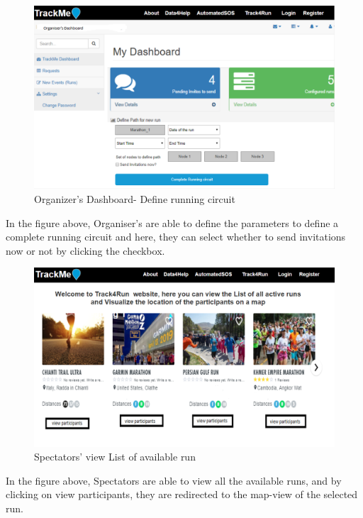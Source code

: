 \documentclass[hidelinks, 12pt]{report}
\begin{document}
	 \begin{figure}[H]
		\centering
		\includegraphics[scale=0.35]{../Assets/organizer_dashboard_2.png}\caption[UI: Organiser's Dashboard - Define running circuit]{Organizer's Dashboard- Define running circuit}
		\label{fig:Make_Request}
	\end{figure}
	In the figure above, Organiser's are able to define the parameters to define a complete running circuit and here, they can select whether to send invitations now or not by clicking the checkbox.
	
	\begin{figure}[H]
		\centering
		\includegraphics[scale=0.35]{../Assets/t4r_list_of_available_run.png}\caption[UI: Spectators' view List of available run]{Spectators' view List of available run}
		\label{fig:Make_Request}
	\end{figure}
	In the figure above, Spectators are able to view all the available runs, and by clicking on view participants, they are redirected to the map-view of the selected run. 
	
\end{document}
